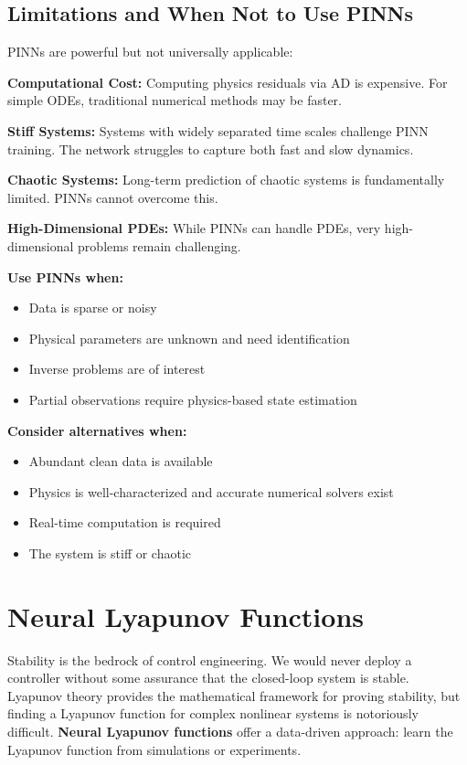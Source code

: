 \subsection{Limitations and When Not to Use PINNs}

PINNs are powerful but not universally applicable:

\textbf{Computational Cost:} Computing physics residuals via AD is expensive. For simple ODEs, traditional numerical methods may be faster.

\textbf{Stiff Systems:} Systems with widely separated time scales challenge PINN training. The network struggles to capture both fast and slow dynamics.

\textbf{Chaotic Systems:} Long-term prediction of chaotic systems is fundamentally limited. PINNs cannot overcome this.

\textbf{High-Dimensional PDEs:} While PINNs can handle PDEs, very high-dimensional problems remain challenging.

\textbf{Use PINNs when:}
\begin{itemize}
    \item Data is sparse or noisy
    \item Physical parameters are unknown and need identification
    \item Inverse problems are of interest
    \item Partial observations require physics-based state estimation
\end{itemize}

\textbf{Consider alternatives when:}
\begin{itemize}
    \item Abundant clean data is available
    \item Physics is well-characterized and accurate numerical solvers exist
    \item Real-time computation is required
    \item The system is stiff or chaotic
\end{itemize}

\section{Neural Lyapunov Functions}
\label{sec:neural_lyapunov}

Stability is the bedrock of control engineering. We would never deploy a controller without some assurance that the closed-loop system is stable. Lyapunov theory provides the mathematical framework for proving stability, but finding a Lyapunov function for complex nonlinear systems is notoriously difficult. \textbf{Neural Lyapunov functions} offer a data-driven approach: learn the Lyapunov function from simulations or experiments.

